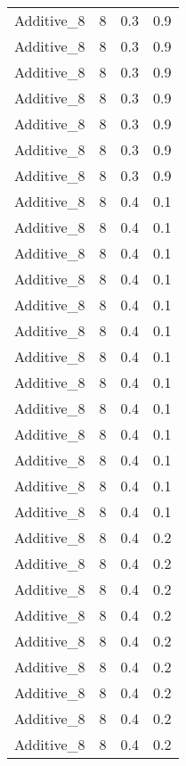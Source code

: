 \documentclass{article}
\begin{document}
\begin{longtable}[H]{lrrr}
 Additive\_8 &       8 &   0.3 &            0.9 \\
 Additive\_8 &       8 &   0.3 &            0.9 \\
 Additive\_8 &       8 &   0.3 &            0.9 \\
 Additive\_8 &       8 &   0.3 &            0.9 \\
 Additive\_8 &       8 &   0.3 &            0.9 \\
 Additive\_8 &       8 &   0.3 &            0.9 \\
 Additive\_8 &       8 &   0.3 &            0.9 \\
 Additive\_8 &       8 &   0.4 &            0.1 \\
 Additive\_8 &       8 &   0.4 &            0.1 \\
 Additive\_8 &       8 &   0.4 &            0.1 \\
 Additive\_8 &       8 &   0.4 &            0.1 \\
 Additive\_8 &       8 &   0.4 &            0.1 \\
 Additive\_8 &       8 &   0.4 &            0.1 \\
 Additive\_8 &       8 &   0.4 &            0.1 \\
 Additive\_8 &       8 &   0.4 &            0.1 \\
 Additive\_8 &       8 &   0.4 &            0.1 \\
 Additive\_8 &       8 &   0.4 &            0.1 \\
 Additive\_8 &       8 &   0.4 &            0.1 \\
 Additive\_8 &       8 &   0.4 &            0.1 \\
 Additive\_8 &       8 &   0.4 &            0.1 \\
 Additive\_8 &       8 &   0.4 &            0.2 \\
 Additive\_8 &       8 &   0.4 &            0.2 \\
 Additive\_8 &       8 &   0.4 &            0.2 \\
 Additive\_8 &       8 &   0.4 &            0.2 \\
 Additive\_8 &       8 &   0.4 &            0.2 \\
 Additive\_8 &       8 &   0.4 &            0.2 \\
 Additive\_8 &       8 &   0.4 &            0.2 \\
 Additive\_8 &       8 &   0.4 &            0.2 \\
 Additive\_8 &       8 &   0.4 &            0.2 \\

\end{longtable}
\end{document}
